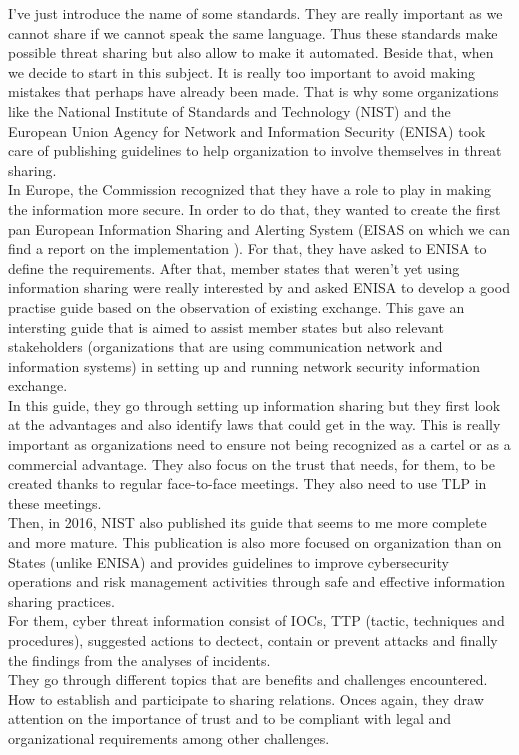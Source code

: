 \documentclass{eplmastersthesis}
\begin{document}
I've just introduce the name of some standards. They are really important as we cannot share if we cannot speak the same language. Thus these standards make possible threat sharing but also allow to make it automated. Beside that, when we decide to start in this subject. It is really too important to avoid making mistakes that perhaps have already been made. That is why some organizations like the National Institute of Standards and Technology (NIST) and the European Union Agency for Network and Information Security (ENISA) took care of publishing guidelines to help organization to involve themselves in threat sharing.\\
In Europe, the Commission recognized that they have a role to play in making the information more secure. In order to do that, they wanted to create the first pan European Information Sharing and Alerting System (EISAS on which we can find a report on the implementation \cite{eisasRapport}). For that, they have asked to ENISA to define the requirements. After that, member states that weren't yet using information sharing were really interested by and asked ENISA to develop a good practise guide based on the observation of existing exchange. This gave an intersting guide \cite{enisaguide2009} that is aimed to assist member states but also relevant stakeholders (organizations that are using communication network and information systems) in setting up and running network security information exchange.\\
In this guide, they go through setting up information sharing but they first look at the advantages and also identify laws that could get in the way. This is really important as organizations need to ensure not being recognized as a cartel or as a commercial advantage. They also focus on the trust that needs, for them, to be created thanks to regular face-to-face meetings. They also need to use TLP in these meetings.\\
Then, in 2016, NIST also published its guide \cite{johnson2014guide} that seems to me more complete and more mature. This publication is also more focused on organization than on States (unlike ENISA) and provides guidelines to improve cybersecurity operations and risk management activities through safe and effective information sharing practices.\\
For them, cyber threat information consist of IOCs, TTP (tactic, techniques and procedures), suggested actions to dectect, contain or prevent attacks and finally the findings from the analyses of incidents. \\
They go through different topics that are benefits and challenges encountered. How to establish and participate to sharing relations. Onces again, they draw attention on the importance of trust and to be compliant with legal and organizational requirements among other challenges.\\
\end{document}
